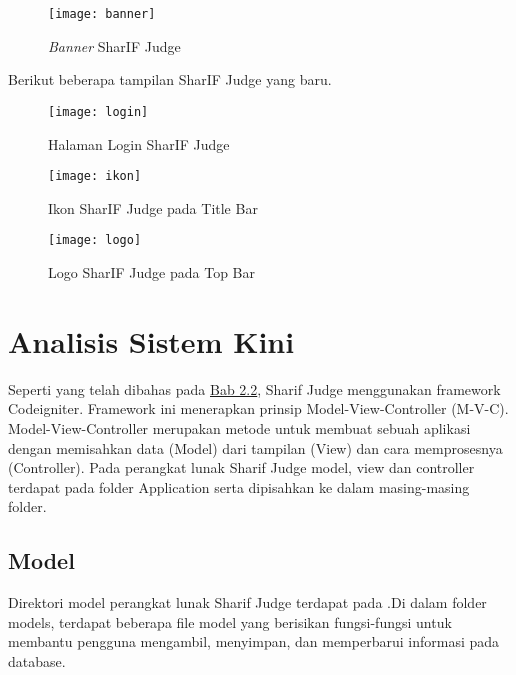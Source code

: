 \begin{figure}[H]
	\centering  
	\texttt{[image: banner]}  
	\caption[\textit{Banner} SharIF Judge]{\textit{Banner} SharIF Judge} 
	\label{fig:banner} 
\end{figure} 

\pagebreak

Berikut beberapa tampilan SharIF Judge yang baru.
\begin{figure}[H]
	\centering  
	\texttt{[image: login]}  
	\caption[Halaman Login SharIF Judge]{Halaman Login SharIF Judge} 
	\label{fig:login} 
\end{figure}

\begin{figure}[H]
	\centering  
	\texttt{[image: ikon]}  
	\caption[Ikon SharIF Judge pada Title Bar]{Ikon SharIF Judge pada Title Bar} 
	\label{fig:ikon} 
\end{figure} 

\begin{figure}[H]
	\centering  
	\texttt{[image: logo]}  
	\caption[Logo SharIF Judge pada Top Bar]{Logo SharIF Judge pada Top Bar} 
	\label{fig:logo} 
\end{figure} 

\pagebreak

\section{Analisis Sistem Kini}

Seperti yang telah dibahas pada \hyperref[sec:sharifjudge]{Bab 2.2}, Sharif Judge menggunakan framework Codeigniter. Framework ini menerapkan prinsip Model-View-Controller (M-V-C). Model-View-Controller merupakan metode untuk membuat sebuah aplikasi dengan memisahkan data (Model) dari tampilan (View) dan cara memprosesnya (Controller). Pada perangkat lunak Sharif Judge model, view dan controller terdapat pada folder Application serta dipisahkan ke dalam masing-masing folder.  

\subsection{Model}
Direktori model perangkat lunak Sharif Judge terdapat pada .Di dalam folder models, terdapat beberapa file model yang berisikan fungsi-fungsi untuk membantu pengguna mengambil, menyimpan, dan memperbarui informasi pada database.

